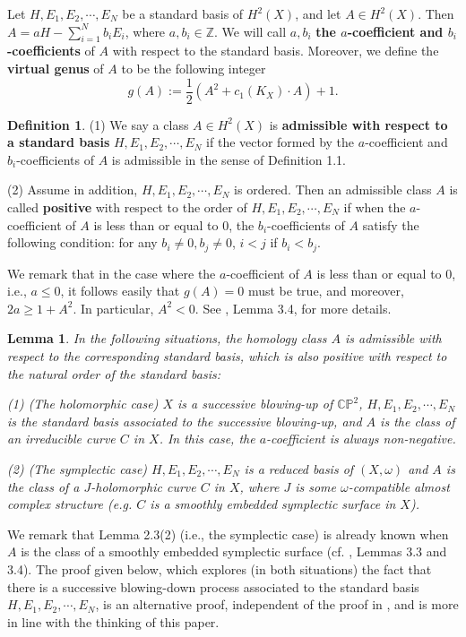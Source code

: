 \documentclass[11pt]{amsart}
\theoremstyle{plain}
\numberwithin{theorem}{section}
\newtheorem{lemma}[theorem]{Lemma}
\theoremstyle{definition}
\newtheorem{definition}[theorem]{Definition}
\newcommand{\C}{{\mathbb C}}
\newcommand{\Z}{{\mathbb Z}}
\renewcommand{\P}{{\mathbb P}}
\begin{document}
Let $H,E_1,E_2,\cdots,E_N$ be a standard basis of $H^2(X)$, and let $A\in H^2(X)$. Then 
$A=aH-\sum_{i=1}^N b_i E_i$, where $a,b_i\in\Z$. We will call $a, b_i$ {\bf the $a$-coefficient and
$b_i$-coefficients} of $A$ with respect to the standard basis. Moreover, we define the {\bf virtual genus}
of $A$ to be the following integer
$$
g(A):=\frac{1}{2}(A^2+c_1(K_X)\cdot A)+1.
$$

\begin{definition}
(1) We say a class $A\in H^2(X)$ is {\bf admissible with respect to a standard basis} $H,E_1,E_2,\cdots,E_N$ if the vector formed by the $a$-coefficient and $b_i$-coefficients of $A$ is admissible in the sense of Definition 1.1.

(2) Assume in addition, $H,E_1,E_2,\cdots,E_N$ is ordered. Then an admissible class $A$ is called {\bf positive} with respect to the order of $H,E_1,E_2,\cdots,E_N$ if when the $a$-coefficient of $A$ is less than or equal to $0$,
the $b_i$-coefficients of $A$ satisfy the following condition: for any $b_i\neq 0, b_j\neq 0$, $i<j$ if $b_i<b_j$. 
\end{definition}
We remark that in the case where the $a$-coefficient of $A$ is less than or equal to $0$, i.e., $a\leq 0$, it follows easily that $g(A)=0$ must be true, and moreover, $2a\geq 1+A^2$. In particular, $A^2<0$. 
See \cite{C}, Lemma 3.4, for more details.

\begin{lemma}
In the following situations, the homology class $A$ is admissible with respect to the corresponding standard basis,
which is also positive with respect to the natural order of the standard basis:

{\em (1)} {\em (}The holomorphic case{\em)} $X$ is a successive blowing-up of $\C\P^2$,
$H, E_1,E_2,\cdots,E_N$ is the standard basis associated to the successive blowing-up, 
and $A$ is the class of an irreducible curve $C$ in $X$. In this case, the $a$-coefficient is always non-negative.

{\em (2)}  {\em (}The symplectic  case{\em)} $H, E_1,E_2,\cdots,E_N$ is a reduced basis of $(X,\omega)$ and $A$ is the class of a $J$-holomorphic curve $C$ in $X$, where $J$ is some $\omega$-compatible almost complex structure {\em(}e.g. $C$ is a smoothly embedded symplectic surface in $X${\em)}.
\end{lemma}

We remark that Lemma 2.3(2) (i.e., the symplectic case) is already known when $A$ is the class of a smoothly embedded symplectic surface (cf. \cite{C}, Lemmas 3.3 and 3.4). The proof given below, which explores (in both situations) the fact that there is a successive blowing-down process associated to the standard basis 
$H, E_1,E_2,\cdots,E_N$, is an alternative proof, independent of the proof in \cite{C}, and is more in line with the
thinking of this paper. 
\end{document}
